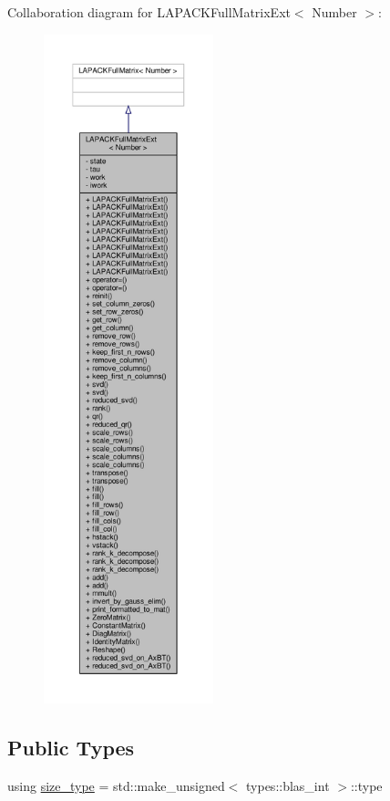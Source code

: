 Collaboration diagram for L\+A\+P\+A\+C\+K\+Full\+Matrix\+Ext$<$ Number $>$\+:\nopagebreak
\begin{figure}[H]
\begin{center}
\leavevmode
\includegraphics[height=550pt]{classLAPACKFullMatrixExt__coll__graph}
\end{center}
\end{figure}
\subsection*{Public Types}
\begin{DoxyCompactItemize}
\item 
using \hyperlink{classLAPACKFullMatrixExt_a5cf5f4a6104dc17029210b5ca52bf574}{size\+\_\+type} = std\+::make\+\_\+unsigned$<$ types\+::blas\+\_\+int $>$\+::type
\end{DoxyCompactItemize}
